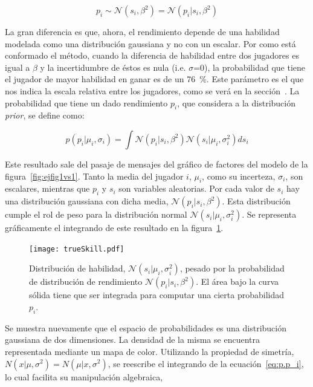 \documentclass[11pt,twoside,spanish]{report} %
\begin{document}
\begin{equation}
p_i \sim \mathcal{N}(s_i, \beta^2) = \mathcal{N}(p_i|s_i, \beta^2)
\end{equation}

La gran diferencia es que, ahora, el rendimiento depende de una habilidad modelada como una distribuci\'on gaussiana y no con un escalar.
Por como est\'a conformado el m\'etodo, cuando la diferencia de habilidad entre dos jugadores es igual a $\beta$ y la incertidumbre de \'estos es nula (i.e. $\sigma$=0), la probabilidad que tiene el jugador de mayor habilidad en ganar es de un \SI{76}{\percent}.
Este par\'ametro es el que nos indica la escala relativa entre los jugadores, como se ver\'a en la secci\'on~.
La probabilidad que tiene un dado rendimiento $p_i$, que considera a la distribuci\'on \textit{prior}, se define como:

\begin{equation}\label{eq:p.p_i}
p(p_i|\mu_i,\sigma_i) = \int \mathcal{N}(p_i| s_i, \beta^2)\mathcal{N}(s_i|\mu_i,\sigma_i^2) ds_i
\end{equation}

Este resultado sale del pasaje de mensajes del gr\'afico de factores del modelo de la figura~\ref{fig:ejfig1vs1}. 
Tanto la media del jugador $i$, $\mu_i$, como su incerteza, $\sigma_i$, son escalares, mientras que  $p_i$ y $s_i$ son variables aleatorias.
Por cada valor de $s_i$ hay una distribuci\'on gaussiana con dicha media, $\mathcal{N}(p_i| s_i, \beta^2)$.
Esta distribuci\'on cumple el rol de peso para la distribuci\'on normal  $\mathcal{N}(s_i|\mu_i,\sigma_i^2)$.
Se representa gr\'aficamente el integrando de este resultado en la figura~\ref{fig:fig8}.

\begin{figure}[H]
	\centering
	\texttt{[image: trueSkill.pdf]}
	\caption{Distribuci\'on de habilidad, $\mathcal{N}(s_i|\mu_i,\sigma_i^2)$, pesado por la probabilidad de distribuci\'on de rendimiento $\mathcal{N}(p_i|s_i,\beta^2)$. El \'area bajo la curva s\'olida tiene que ser integrada para computar una cierta probabilidad $p_i$.}
	\label{fig:fig8}
\end{figure}

Se muestra nuevamente que el espacio de probabilidades es una distribuci\'on gaussiana de dos dimensiones.
La densidad de la misma se encuentra representada mediante un mapa de color.
Utilizando la propiedad de simetr\'ia, $ N (x| \mu, \sigma^2) = N (\mu| x, \sigma^2)$, se reescribe el integrando de la ecuaci\'on~\ref{eq:p.p_i}, lo cual facilita su manipulaci\'on algebraica,
\end{document}
